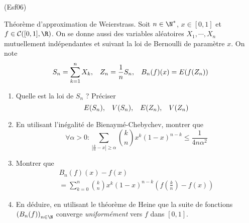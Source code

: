 \begin{tiny}(Esf06)\end{tiny} Théorème d'approximation de Weierstrass.\newline
Soit $n\in \N^*$, $x\in[0,1]$ et $f\in \mathcal{C}([0,1],\R)$.\newline
On se donne aussi des variables aléatoires $X_1,\cdots, X_n$ mutuellement indépendantes et suivant la loi de Bernoulli de paramètre $x$. On note
\begin{displaymath}
  S_n = \sum_{k=1}^n X_k,\hspace{0.3cm} Z_n = \frac{1}{n} S_n, \hspace{0.3cm}
  B_n(f)(x) = E(f(Z_n))
\end{displaymath}
\begin{enumerate}
  \item Quelle est la loi de $S_n$ ? Préciser
\begin{displaymath}
E(S_n),\hspace{0.3cm} V(S_n),\hspace{0.3cm} E(Z_n),\hspace{0.3cm} V(Z_n)
\end{displaymath}

  \item En utilisant l'inégalité de Bienaymé-Chebychev, montrer que 
\begin{displaymath}
\forall \alpha >0:
\sum_{\left|\frac{k}{n}-x\right|\geq \alpha} \binom{k}{n}x^k (1-x)^{n-k} 
\leq \frac{1}{4n\alpha^2}
\end{displaymath}
  \item Montrer que 
\begin{multline*}
B_n(f)(x)-f(x) \\ 
= \sum_{k=0}^{n} \binom{k}{n}x^k (1-x)^{n-k}\left(f(\frac{k}{n})-f(x) \right)  
\end{multline*}

  \item En déduire, en utilisant le théorème de Heine que la suite de fonctions $\left( B_n(f)\right)_{n\in \N}$ converge \emph{uniformément} vers $f$ dans $[0,1]$.
\end{enumerate}
